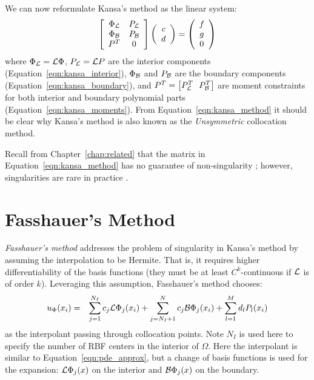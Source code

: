 \documentclass{report}
\begin{document}
{We can now reformulate Kansa's method as the linear system: 
\begin{eqnarray}
\left[ \begin{array}{c c} 
	\Phi_{\mathcal{L}} & P_{\mathcal{L}} \\
	\Phi_{\mathcal{B}} & P_{\mathcal{B}} \\
	P^T & 0
	\end{array} \right] \left( \begin{array}{c}
							{c} \\
							{d}
							 \end{array}
						 \right) = \left( \begin{array}{c}
							{f} \\
							{g} \\
							0
							 \end{array}
						 \right) 
	\label{eqn:kansa_method}
\end{eqnarray}
where $\Phi_{\mathcal{L}} = \mathcal{L}\Phi$, $P_{\mathcal{L}} = \mathcal{L}P$ are the interior components (Equation~\ref{eqn:kansa_interior}), $\Phi_{\mathcal{B}}$ and $P_{\mathcal{B}}$ are the boundary components (Equation~\ref{eqn:kansa_boundary}), and $P^T = \left[P_\diffop{}^T \ \ P_\boundop{}^T\right]$ are moment constraints for both interior and boundary polynomial parts (Equation~\ref{eqn:kansa_moments}). From Equation~\ref{eqn:kansa_method} it should be clear why Kansa's method is also known as the \emph{Unsymmetric} collocation method. 

Recall from Chapter~\ref{chap:related} that the matrix in Equation~\ref{eqn:kansa_method} has no guarantee of non-singularity \cite{Fasshauer:1997}; however, singularities are rare in practice \cite{Larsson:2003}.

\section{Fasshauer's Method}

\emph{Fasshauer's method} \cite{Fasshauer:1997} addresses the problem of singularity in Kansa's method by assuming the interpolation to be Hermite. That is, it requires higher differentiability of the basis functions (they must be at least $C^k$-continuous if $\mathcal{L}$ is of order $k$). Leveraging this assumption, Fasshauer's method chooses: 
\begin{eqnarray}
u_\Phi(x_i) & = & \sum_{j=1}^{N_I}  c_j \mathcal{L}\Phi_j(x_i) + \sum_{j=N_{I} + 1}^{N} c_j \mathcal{B}\Phi_j(x_i) + \sum_{l=1}^{M}d_l P_l(x_i)
\label{eqn:fasshauer_approx}
\end{eqnarray}
as the interpolant passing through collocation points. Note $N_I$ is used here to specify the number of RBF centers in the interior of $\Omega$. Here the interpolant is similar to Equation~\ref{eqn:pde_approx}, but a change of basis functions is used for the expansion: $\mathcal{L}\Phi_j(x)$ on the interior and $\mathcal{B}\Phi_j(x)$ on the boundary.

}
\end{document}
